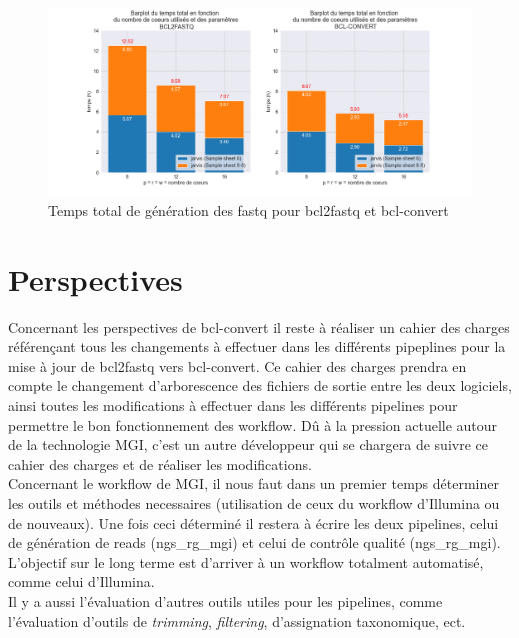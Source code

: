 {{\begin{figure}[H]
    \centering
    \includegraphics[width=1\textwidth]{img/barplot_total_time_comp.png}
    \caption{\footnotesize{Temps total de génération des fastq pour bcl2fastq et bcl-convert}}
    \label{fig-total-time}
\end{figure}


 
\section{Perspectives}
Concernant les perspectives de bcl-convert il reste à réaliser un cahier des charges référençant tous les changements à effectuer dans les différents pipeplines pour la mise à jour de bcl2fastq vers bcl-convert. Ce cahier des charges prendra en compte le changement d'arborescence des fichiers de sortie entre les deux logiciels, ainsi toutes les modifications à effectuer dans les différents pipelines pour permettre le bon fonctionnement des workflow. Dû à la pression actuelle autour de la technologie MGI, c'est un autre développeur qui se chargera de suivre ce cahier des charges et de réaliser les modifications.\\

Concernant le workflow de MGI, il nous faut dans un premier temps déterminer les outils et méthodes necessaires (utilisation de ceux du workflow d'Illumina ou de nouveaux). Une fois ceci déterminé il restera à écrire les deux pipelines, celui de génération de reads (ngs\_rg\_mgi) et celui de contrôle qualité (ngs\_rg\_mgi). L'objectif sur le long terme est d'arriver à un workflow totalment automatisé, comme celui d'Illumina.\\

Il y a aussi l'évaluation d'autres outils utiles pour les pipelines, comme l'évaluation d'outils de \emph{trimming}, \emph{filtering}, d'assignation taxonomique, ect.

}}
